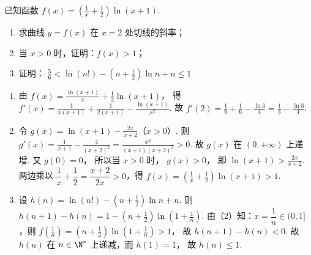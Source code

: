 \begin{problem}
已知函数 \(f(x)=\left( \frac{1}{x}+\frac{1}{2} \right)\ln(x+1)\).

\begin{enumerate}
\item 求曲线 \(y=f(x)\) 在 \(x=2\) 处切线的斜率；
\item 当 \(x>0\) 时，证明：\(f(x)>1\)；
\item 证明：
\(\frac{5}{6}<\ln(n!)-\left( n+\frac{1}{2} \right)\ln n+n\le 1\)
\end{enumerate}
\end{problem}

\begin{solution}
\begin{enumerate}
\item 由
\(f(x)=\frac{\ln(x+1)}{x}+\frac{1}{2}\ln(x+1)\)，
得
\(f'(x)=\frac{1}{x(x+1)}+\frac{1}{2(x+1)}-\frac{\ln(x+1)}{x^2}\).
故
\(f'(2)=\frac{1}{6}+\frac{1}{6}-\frac{\ln 3}{4}=\frac{1}{3}-\frac{\ln 3}{4}\).

\item 令
\(g(x)=\ln(x+1)-\frac{2x}{x+2}\)（\(x>0\)）.
则 \(g'(x)=\frac{1}{x+1}-\frac{4}{(x+2)^2}=\frac{x^2}{(x+1)(x+2)^2}>0\).
故 \(g(x)\) 在 \((0,+\infty)\) 上递增. 又
\(g(0)=0\)，
所以当 \(x>0\) 时，
\(g(x)>0\)，
即
\(\ln(x+1)>\frac{2x}{x+2}\).
两边乘以 \(\dfrac{1}{x}+\dfrac{1}{2}=\dfrac{x+2}{2x}>0\)，得
\(f(x)=\left( \frac{1}{x}+\frac{1}{2} \right)\ln(x+1)>1\).

\item 设
\(h(n)=\ln(n!)-\left( n+\frac{1}{2} \right)\ln n+n\).
则
\(h(n+1)-h(n)=1-\left( n+\frac{1}{2} \right)\ln\left( 1+\frac{1}{n} \right)\).
由（2）知：\(x=\dfrac{1}{n}\in (0,1]\)，则
\(f\left( \frac{1}{n} \right)=\left( n+\frac{1}{2} \right)\ln\left( 1+\frac{1}{n} \right)>1\)，
故
\(h(n+1)-h(n)<0\).
故 \(h(n)\) 在 \(n\in \N^*\) 上递减，而
\(h(1)=1\)，
故
\(h(n)\le 1\).


\end{enumerate}
\end{solution}

